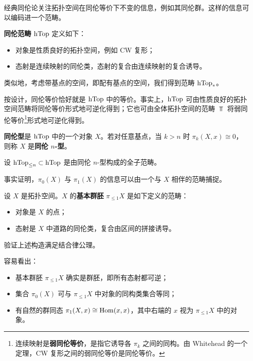 \nitem\label{L1-4.3} 经典同伦论关注拓扑空间在同伦等价下不变的信息，例如其同伦群。这样的信息可以编码进一个范畴。

\begin{construction}\label{L1-4.4}
\textbf{同伦范畴} $\operatorname{hTop}$ 定义如下：
\begin{itemize}[leftmargin=2.2em,itemsep=0.1em]
\item 对象是性质良好的拓扑空间，例如 CW 复形；
\item 态射是连续映射的同伦类，态射的复合由连续映射的复合诱导。
\end{itemize}
\end{construction}

\begin{variant}\label{L1-4.5}
类似地，考虑带基点的空间，即配有基点的空间，我们得到范畴 $\operatorname{hTop}_\ast$。
\end{variant}

\nitem\label{L1-4.6} 按设计，同伦等价恰好就是 $\operatorname{hTop}$ 中的等价。事实上，$\operatorname{hTop}$ 可由性质良好的拓扑空间范畴将同伦等价形式地可逆化得到；它也可由全体拓扑空间的范畴 $\Top$ 将弱同伦等价\footnote{连续映射是\textbf{弱同伦等价}，是指它诱导各 $\pi_k$ 之间的同构。由 Whitehead 的一个定理，CW 复形之间的弱同伦等价是同伦等价。}形式地可逆化得到。

\begin{definition}\label{L1-4.7}
\textbf{同伦型}是 $\operatorname{hTop}$ 中的一个对象 $X$。若对任意基点，当 $k>n$ 时 $\pi_k(X,x)\cong 0$，则称 $X$ 是\textbf{同伦 $n$-型}。
\end{definition}

设 $\operatorname{hTop}_{\le n}\subset\operatorname{hTop}$ 是由同伦 $n$-型构成的全子范畴。

\nitem\label{L1-4.8} 事实证明，$\pi_0(X)$ 与 $\pi_1(X)$ 的信息可以由一个与 $X$ 相伴的范畴捕捉。

\begin{construction}\label{L1-4.9}
设 $X$ 是拓扑空间。$X$ 的\textbf{基本群胚} $\pi_{\le 1}X$ 是如下定义的范畴：
\begin{itemize}[leftmargin=2.2em,itemsep=0.1em]
\item 对象是 $X$ 的点；
\item 态射是 $X$ 中道路的同伦类，复合由区间的拼接诱导。
\end{itemize}
\end{construction}

\begin{exercise}\label{L1-4.10}
验证上述构造满足结合律公理。
\end{exercise}

\nitem\label{L1-4.11} 容易看出：
\begin{itemize}[leftmargin=2.2em,itemsep=0.1em]
\item 基本群胚 $\pi_{\le 1}X$ 确实是群胚，即所有态射都可逆；
\item 集合 $\pi_0(X)$ 可与 $\pi_{\le 1}X$ 中对象的同构类集合等同；
\item 有自然的群同态 $\pi_1(X,x)\cong\operatorname{Hom}(x,x)$，其中右端的 $x$ 视为 $\pi_{\le 1}X$ 中的对象。
\end{itemize}


